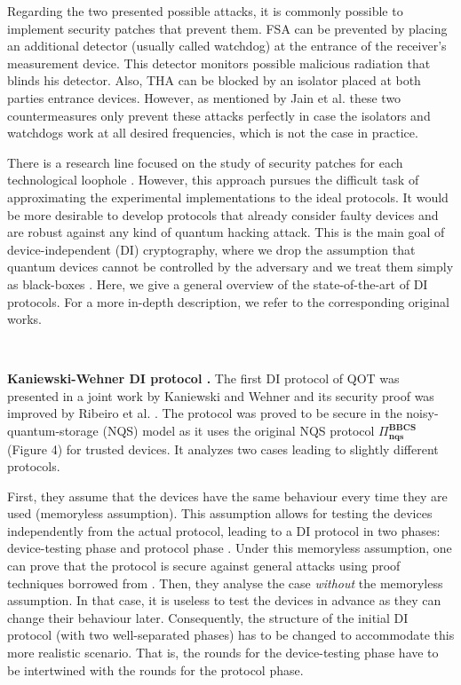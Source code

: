 Regarding the two presented possible attacks, it is commonly possible to implement security patches that prevent them. FSA can be prevented by placing an additional detector (usually called watchdog) at the entrance of the receiver's measurement device. This detector monitors possible malicious radiation that blinds his detector. Also, THA can be blocked by an isolator placed at both parties entrance devices. However, as mentioned by Jain et al. \cite{JSKEML16} these two countermeasures only prevent these attacks perfectly in case the isolators and watchdogs work at all desired frequencies, which is not the case in practice. 

There is a research line focused on the study of security patches for each technological loophole \cite{JBI+16}. However, this approach pursues the difficult task of approximating the experimental implementations to the ideal protocols. It would be more desirable to develop protocols that already consider faulty devices and are robust against any kind of quantum hacking attack. This is the main goal of device-independent (DI) cryptography, where we drop the assumption that quantum devices cannot be controlled by the adversary and we treat them simply as black-boxes \cite{MY04, E91}. Here, we give a general overview of the state-of-the-art of DI protocols. For a more in-depth description, we refer to the corresponding original works.

\

\noindent\textbf{Kaniewski-Wehner DI protocol \cite{KW16}.} The first DI protocol of QOT was presented in a joint work by Kaniewski and Wehner \cite{KW16} and its security proof was improved by Ribeiro et al. \cite{RTK+18}. The protocol was proved to be secure in the noisy-quantum-storage (NQS) model as it uses the original NQS protocol $\Pi^{\textbf{BBCS}}_{\textbf{nqs}}$ (Figure 4) for trusted devices. It analyzes two cases leading to slightly different protocols. 

First, they assume that the devices have the same behaviour every time they are used (memoryless assumption). This assumption allows for testing the devices independently from the actual protocol, leading to a DI protocol in two phases: device-testing phase and protocol phase . Under this memoryless assumption, one can prove that the protocol is secure against general attacks using proof techniques borrowed from \cite{KWW12}. Then, they analyse the case \textit{without} the memoryless assumption. In that case, it is useless to test the devices in advance as they can change their behaviour later. Consequently, the structure of the initial DI protocol (with two well-separated phases) has to be changed to accommodate this more realistic scenario. That is, the rounds for the device-testing phase have to be intertwined with the rounds for the protocol phase. 

